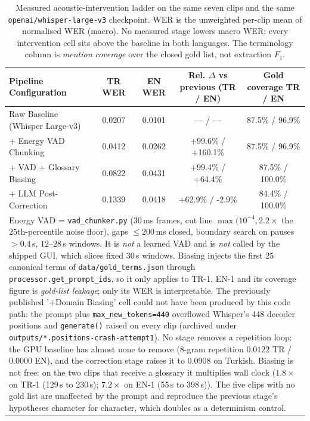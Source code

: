\begin{table}[t]
\caption{Measured acoustic-intervention ladder on the same seven clips and the same
\texttt{openai/whisper-large-v3} checkpoint. WER is the unweighted per-clip mean of
normalised WER (macro). No measured stage lowers macro WER: every intervention cell sits above the baseline in both languages. The terminology column is
\emph{mention coverage} over the closed gold list, not extraction $F_1$.}
\label{tab:interventions}
\centering
\renewcommand{\arraystretch}{1.15}
\setlength{\tabcolsep}{3.0pt}
\begin{tabular}{@{}lcccc@{}}
\toprule
\textbf{Pipeline Configuration} & \textbf{TR WER} & \textbf{EN WER} &
\textbf{Rel. $\Delta$ vs previous (TR / EN)} & \textbf{Gold coverage TR / EN} \\
\midrule
Raw Baseline (Whisper Large-v3) & 0.0207 & 0.0101 & --- / --- & 87.5\% / 96.9\% \\
+ Energy VAD Chunking & 0.0412 & 0.0262 & +99.6\% / +160.1\% & 87.5\% / 96.9\% \\
+ VAD + Glossary Biasing & 0.0822 & 0.0431 & +99.4\% / +64.4\% & 87.5\% / 100.0\% \\
+ LLM Post-Correction & 0.1339 & 0.0418 & +62.9\% / -2.9\% & 84.4\% / 100.0\% \\
\bottomrule
\multicolumn{5}{p{0.98\columnwidth}}{\footnotesize
Energy VAD = \texttt{vad\_chunker.py} ($30$\,ms frames, cut line
$\max(10^{-4}, 2.2\times$ the $25$th-percentile noise floor), gaps $\le 200$\,ms
closed, boundary search on pauses $>0.4$\,s, $12$--$28$\,s windows. It is
\emph{not} a learned VAD and is \emph{not} called by the shipped GUI, which slices
fixed $30$\,s windows. Biasing injects the first $25$ canonical terms of
\texttt{data/gold\_terms.json} through \texttt{processor.get\_prompt\_ids}, so it
only applies to TR-1, EN-1 and its coverage figure is \emph{gold-list leakage};
only its WER is interpretable. The previously published '+Domain Biasing' cell could not
have been produced by this code path: the prompt plus \texttt{max\_new\_tokens=440}
overflowed Whisper's $448$ decoder positions and \texttt{generate()} raised on every
clip (archived under \texttt{outputs/*.positions-crash-attempt1}). No stage removes a repetition loop: the GPU baseline has almost none to remove ($8$-gram repetition $0.0122$ TR / $0.0000$ EN), and the correction stage raises it to $0.0908$ on Turkish. Biasing is not free: on the two clips that receive a glossary it multiplies wall clock ($1.8\times$ on TR-1 (129\,s to 230\,s); $7.2\times$ on EN-1 (55\,s to 398\,s)). The five clips with no gold list are unaffected by the prompt and reproduce the previous stage's hypotheses character for character, which doubles as a determinism control.}
\end{tabular}
\end{table}
